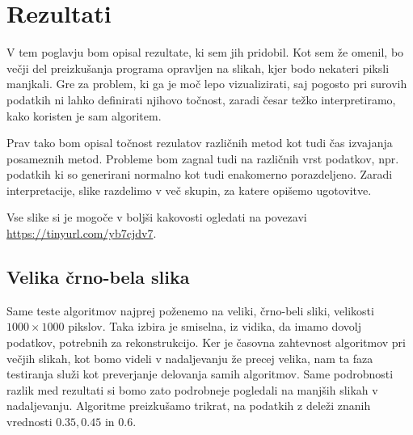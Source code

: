 \chapter{Rezultati}
V tem poglavju bom opisal rezultate, ki sem jih pridobil. Kot sem že omenil, bo večji del preizkušanja programa opravljen na slikah, kjer bodo nekateri piksli manjkali. Gre za problem, ki ga je moč lepo vizualizirati, saj pogosto pri surovih podatkih ni lahko definirati njihovo točnost, zaradi česar težko interpretiramo, kako koristen je sam algoritem.

Prav tako bom opisal točnost rezulatov različnih metod kot tudi čas izvajanja posameznih metod. Probleme bom zagnal tudi na različnih vrst podatkov, npr. podatkih ki so generirani normalno kot tudi enakomerno porazdeljeno.
Zaradi interpretacije, slike razdelimo v več skupin, za katere opišemo ugotovitve.

Vse slike si je mogoče v boljši kakovosti ogledati na povezavi \url{https://tinyurl.com/yb7cjdv7}. 

\section{Velika črno-bela slika}
Same teste algoritmov najprej poženemo na veliki, črno-beli sliki, velikosti $1000\times1000$ pikslov. Taka izbira je smiselna, iz vidika, da imamo dovolj podatkov, potrebnih za rekonstrukcijo. Ker je časovna zahtevnost algoritmov pri večjih slikah, kot bomo videli v nadaljevanju že precej velika, nam ta faza testiranja služi kot preverjanje delovanja samih algoritmov. Same podrobnosti razlik med rezultati si bomo zato podrobneje pogledali na manjših slikah v nadaljevanju. Algoritme preizkušamo trikrat, na podatkih z deleži znanih vrednosti $0.35, 0.45$ in $0.6$. 

\FloatBarrier

